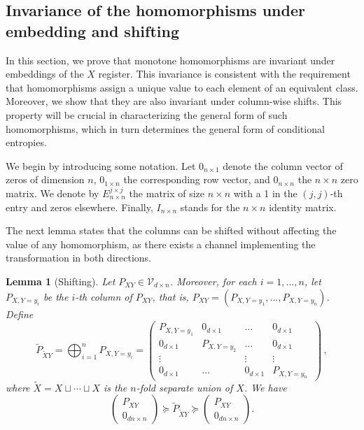 \documentclass[aps,pra,11pt,onecolumn,nofootinbib,tightenlines]{revtex4-2}
\newtheorem{lemma}[theorem]{Lemma}
\theoremstyle{definition}
\newcommand{\V}{\mathcal{V}}
\begin{document}
\subsection{Invariance of the homomorphisms under embedding and shifting}
\label{sec: invariance embedding and shifting}
In this section, we prove that monotone homomorphisms are invariant under embeddings of the $X$ register. This invariance is consistent with the requirement that homomorphisms assign a unique value to each element of an equivalent class. Moreover, we show that they are also invariant under column-wise shifts.
This property will be crucial in characterizing the general form of such homomorphisms, which in turn determines the general form of conditional entropies. 

\bigskip
We begin by introducing some notation. Let $0_{n \times 1}$ denote the column vector of zeros of dimension $n$, $0_{1 \times n}$ the corresponding row vector, and $0_{n \times n}$ the $n \times n$ zero matrix. We denote by $E^{j \times j}_{n \times n}$ the matrix of size $n \times n$ with a 1 in the $(j, j)$-th entry and zeros elsewhere. Finally, $I_{n \times n}$ stands for the $n \times n$ identity matrix.


The next lemma states that the columns can be shifted without affecting the value of any homomorphism, as there exists a channel implementing the transformation in both directions.
\begin{lemma}[Shifting]\label{lemma:shifting}
    Let $P_{XY} \in \V_{d\times n}$. Moreover,  for each $i=1,...,n$, let $P_{X,Y=y_i}$ be the $i$-th column of $P_{XY}$, that is, $P_{XY} = (P_{X,Y=y_1},...,P_{X,Y=y_n})$. Define
    \begin{equation}
\widetilde{P}_{\widetilde{X}Y}=\bigoplus_{i=1}^n P_{X,Y=y_i}= \begin{pmatrix}
P_{X,Y=y_1} & 0_{d \times 1}  & \hdots & 0_{d \times 1} \\
0_{d \times 1} & P_{X,Y=y_2} & \hdots & 0_{d \times 1} \\
\vdots &  & \vdots & \vdots\\
0_{d \times 1} & \hdots & 0_{d \times 1} & P_{X,Y=y_n}\,
\end{pmatrix} \,,
\end{equation} 
where $\widetilde{X}=X\sqcup\cdots\sqcup X$ is the $n$-fold separate union of $X$. We have
\begin{equation}
 \begin{pmatrix}
        P_{XY}\\
        0_{dn \times n}
    \end{pmatrix}\succeq\widetilde{P}_{\widetilde{X}Y}\succeq  \begin{pmatrix}
        P_{XY}\\
        0_{dn \times n}
    \end{pmatrix}.
\end{equation}
\end{lemma}
\end{document}
